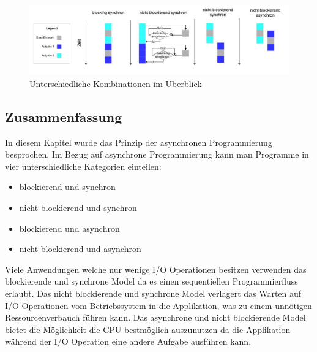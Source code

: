 \begin{figure}[!htb]
  \centering
  \includegraphics[width=16cm]{images/synchron_blocking.jpg}
  \caption{
    Unterschiedliche Kombinationen im Überblick
  }
  \label{figure:synchron_blocking}
\end{figure}

\subsection{Zusammenfassung}

In diesem Kapitel wurde das Prinzip der asynchronen Programmierung besprochen. Im Bezug auf asynchrone Programmierung kann man Programme in vier unterschiedliche Kategorien einteilen: 

\begin{itemize}
  \item blockierend und synchron
  \item nicht blockierend und synchron
  \item blockierend und asynchron
  \item nicht blockierend und asynchron
\end{itemize}    

Viele Anwendungen welche nur wenige I/O Operationen besitzen verwenden das blockierende und synchrone Model da es einen sequentiellen Programmierfluss erlaubt. Das nicht blockierende und synchrone Model verlagert das Warten auf I/O Operationen vom Betriebssystem in die Applikation, was zu einem unnötigen Ressourcenverbauch führen kann. Das asynchrone und nicht blockierende Model bietet die Möglichkeit die CPU bestmöglich auszunutzen da die Applikation während der I/O Operation eine andere Aufgabe ausführen kann.